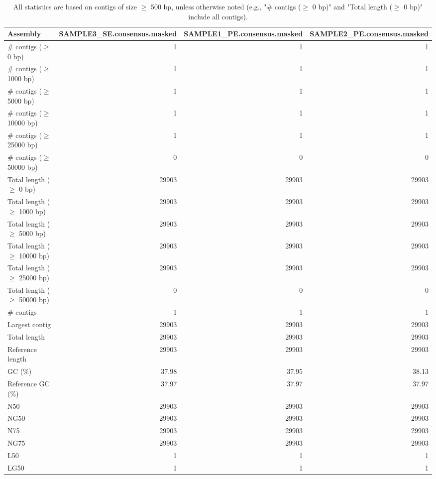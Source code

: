 \documentclass[12pt,a4paper]{article}
\begin{document}
\begin{table}[ht]
\begin{center}
\caption{All statistics are based on contigs of size $\geq$ 500 bp, unless otherwise noted (e.g., "\# contigs ($\geq$ 0 bp)" and "Total length ($\geq$ 0 bp)" include all contigs).}
\begin{tabular}{|l*{3}{|r}|}
\hline
Assembly & SAMPLE3\_SE.consensus.masked & SAMPLE1\_PE.consensus.masked & SAMPLE2\_PE.consensus.masked \\ \hline
\# contigs ($\geq$ 0 bp) & 1 & 1 & 1 \\ \hline
\# contigs ($\geq$ 1000 bp) & 1 & 1 & 1 \\ \hline
\# contigs ($\geq$ 5000 bp) & 1 & 1 & 1 \\ \hline
\# contigs ($\geq$ 10000 bp) & 1 & 1 & 1 \\ \hline
\# contigs ($\geq$ 25000 bp) & 1 & 1 & 1 \\ \hline
\# contigs ($\geq$ 50000 bp) & 0 & 0 & 0 \\ \hline
Total length ($\geq$ 0 bp) & 29903 & 29903 & 29903 \\ \hline
Total length ($\geq$ 1000 bp) & 29903 & 29903 & 29903 \\ \hline
Total length ($\geq$ 5000 bp) & 29903 & 29903 & 29903 \\ \hline
Total length ($\geq$ 10000 bp) & 29903 & 29903 & 29903 \\ \hline
Total length ($\geq$ 25000 bp) & 29903 & 29903 & 29903 \\ \hline
Total length ($\geq$ 50000 bp) & 0 & 0 & 0 \\ \hline
\# contigs & 1 & 1 & 1 \\ \hline
Largest contig & 29903 & 29903 & 29903 \\ \hline
Total length & 29903 & 29903 & 29903 \\ \hline
Reference length & 29903 & 29903 & 29903 \\ \hline
GC (\%) & 37.98 & 37.95 & 38.13 \\ \hline
Reference GC (\%) & 37.97 & 37.97 & 37.97 \\ \hline
N50 & 29903 & 29903 & 29903 \\ \hline
NG50 & 29903 & 29903 & 29903 \\ \hline
N75 & 29903 & 29903 & 29903 \\ \hline
NG75 & 29903 & 29903 & 29903 \\ \hline
L50 & 1 & 1 & 1 \\ \hline
LG50 & 1 & 1 & 1 \\ \hline

\end{tabular}
\end{center}
\end{table}
\end{document}
